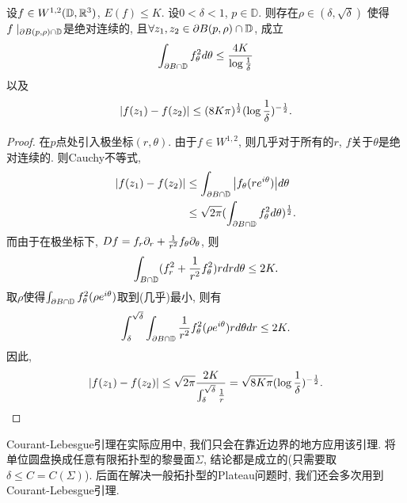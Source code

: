 \begin{lemma} \label{courant_lebesgue}
    设$f \in W^{1,2}(\D,\R^3)$, $E(f) \le K$. 设$0 < \delta < 1$, $p \in \mathbb{D}$. 则存在$\rho \in (\delta, \sqrt{\delta})$ 使得$f\mid_{\P B(p,\rho) \cap \D}$是绝对连续的, 且$\forall z_1,z_2 \in \P B(p,\rho) \cap \D$, 成立 
    \begin{equation}
        \int_{\P B \cap \D} f_\theta^2 d\theta \le \frac{4K}{\log \rec{\delta}}
    \end{equation}
    以及
    \begin{equation}
        \abs{f(z_1)- f(z_2)} \le (8K\pi)^{\frac{1}{2}}(\log \frac{1}{\delta})^{-\frac{1}{2}}.
    \end{equation}
\end{lemma}
\begin{proof}
    在$p$点处引入极坐标$(r,\theta)$. 由于$f \in W^{1,2}$, 则几乎对于所有的$r$, $f$关于$\theta$是绝对连续的.  则Cauchy不等式, 
    \begin{equation}
        \begin{split}
            \abs{f(z_1)-f(z_2)} &\le \int_{\P B \cap \D} \abs{f_\theta(re^{i\theta})}d\theta \\
            & \le \sqrt{2\pi} (\int_{\P B\cap \D} f^2_\theta d\theta)^{\frac{1}{2}}.
        \end{split}
    \end{equation}
    而由于在极坐标下, $Df=f_r \P_r + \frac{1}{r^2}f_\theta \P_\theta$, 则
    \begin{equation}
        \int_{B \cap \D} (f_r^2 + \frac{1}{r^2}f_\theta^2)r drd\theta \le 2K.
    \end{equation}
    取$\rho$使得$\int_{\P B \cap \D} f^2_\theta(\rho e^{i\theta})$取到(几乎)最小, 则有
    \begin{equation}
        \int^{\sqrt{\delta}}_\delta \int_{\P B \cap \D}\frac{1}{r^2}f^2_\theta(\rho e^{i\theta}) rd\theta dr \le 2K.
    \end{equation}
    因此, 
    \begin{equation}
        \abs{f(z_1)-f(z_2)} \le \sqrt{2\pi} \frac{2K}{ \int^{\sqrt{\delta}}_\delta \frac{1}{r}} = \sqrt{8K\pi}(\log \frac{1}{\delta})^{-\frac{1}{2}}.
    \end{equation}
\end{proof}
\begin{remark}
    Courant-Lebesgue引理在实际应用中, 我们只会在靠近边界的地方应用该引理. 将单位圆盘换成任意有限拓扑型的黎曼面$\Sigma$, 结论都是成立的(只需要取$\delta \le C=C(\Sigma)$). 后面在解决一般拓扑型的Plateau问题时, 我们还会多次用到Courant-Lebesgue引理.
\end{remark}
